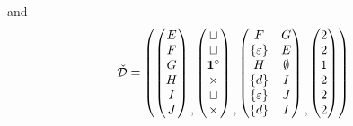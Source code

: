 and
\[
    \check{\mathcal{D}} = \left(
        \begin{pmatrix}
            E\\
            F\\
            G\\
            H\\
            I\\
            J
        \end{pmatrix}
        \begin{matrix}\\\\\\\\\\,\end{matrix}
        \begin{pmatrix}
            \sqcup\\
            \sqcup\\
            \mathbf{1}^\circ\\
            \times\\
            \sqcup\\
            \times
        \end{pmatrix}
        \begin{matrix}\\\\\\\\\\,\end{matrix}
        \begin{pmatrix}
            F & G\\
            \left\{\varepsilon\right\} & E\\
            H & \emptyset\\
            \left\{d\right\} & I\\
            \left\{\varepsilon\right\} & J\\
            \left\{d\right\} & I
        \end{pmatrix}
        \begin{matrix}\\\\\\\\\\,\end{matrix}
        \begin{pmatrix}
            2\\
            2\\
            1\\
            2\\
            2\\
            2
        \end{pmatrix}
    \right)
\]

